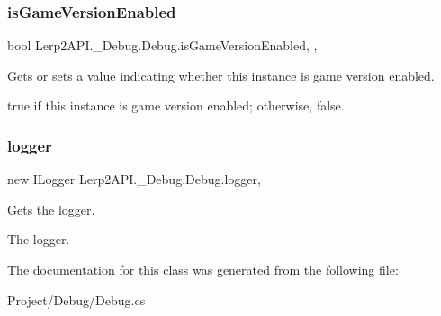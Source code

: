 \subsubsection{\texorpdfstring{is\+Game\+Version\+Enabled}{isGameVersionEnabled}}
{\footnotesize\ttfamily bool Lerp2\+A\+P\+I.\+\_\+\+Debug.\+Debug.\+is\+Game\+Version\+Enabled\hspace{0.3cm}{\ttfamily [static]}, {\ttfamily [get]}, {\ttfamily [set]}}



Gets or sets a value indicating whether this instance is game version enabled. 

{\ttfamily true} if this instance is game version enabled; otherwise, {\ttfamily false}.\mbox{\label{class_lerp2_a_p_i_1_1___debug_1_1_debug_a082a2c3e38f54daeeeaaa441927b07c3}} 
\subsubsection{\texorpdfstring{logger}{logger}}
{\footnotesize\ttfamily new I\+Logger Lerp2\+A\+P\+I.\+\_\+\+Debug.\+Debug.\+logger\hspace{0.3cm}{\ttfamily [static]}, {\ttfamily [get]}}



Gets the logger. 

The logger.

The documentation for this class was generated from the following file\+:\begin{DoxyCompactItemize}
\item 
Project/\+Debug/Debug.\+cs\end{DoxyCompactItemize}
